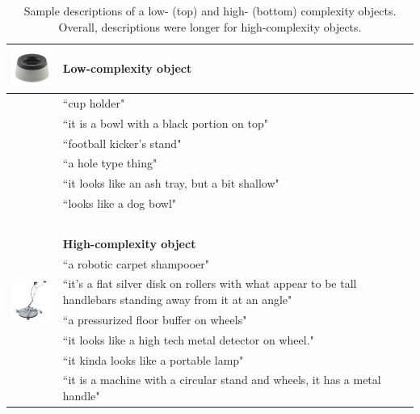 \begin{table}[t!]
\centering

\begin{tabular}{ll}
\toprule
\multirow{6}{*}{\includegraphics[width=2cm]{figs/obj_29_p2.jpg}} & \textbf{Low-complexity object}                \\
\toprule
                   & ``cup holder"                                   \\
                   & ``it is a bowl with a black portion on top"      \\
                   & ``football kicker's stand"                      \\
                   & ``a hole type thing"                              \\
                   & ``it looks like an ash tray, but a bit shallow" \\
                   & ``looks like a dog bowl" \\
 \bottomrule
~ & ~ \\
  \toprule
\multirow{6}{*}{\includegraphics[width=1.8cm]{figs/obj_27_p2.jpg}} & \textbf{High-complexity object}               \\
\toprule
                   & ``a robotic carpet shampooer"                                   \\
                   & \multicolumn{1}{p{12cm}}{ ``it's a flat silver disk on rollers with what appear to be tall handlebars standing away from it at an angle"}                     \\
                   & ``a pressurized floor buffer on wheels"                                   \\
                   & ``it looks like a high tech metal detector on wheel."                                   \\
                   & ``it kinda looks like a portable lamp"                                \\  
                   & ``it is a machine with a circular stand and wheels, it has a metal handle"\\
   \bottomrule
\end{tabular}
\caption{Sample descriptions of a low- (top) and high- (bottom)  complexity objects.  Overall, descriptions were longer for high-complexity objects.}
\label{tab:sample_obj_descriptions}
\end{table}


